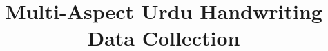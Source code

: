 \newcommand*{\img}[1]{%
    \raisebox{-.02\baselineskip}{%
        \texttt{[image: \#1]}%
    }%
}

\newcommand*\inlinegraphics[1]{%
  \settototalheight\myheight{Xygp}%
  \settodepth\mydepth{Xygp}%
  \raisebox{-\mydepth}{\texttt{[image: \#1]}}%
}
\makeatletter
\def\BState{\State\hskip-\ALG@thistlm}
\makeatother







%
\title{Multi-Aspect Urdu Handwriting Data Collection}

